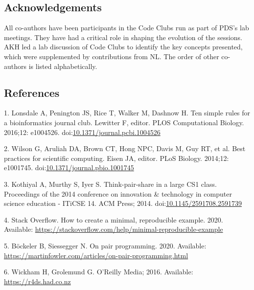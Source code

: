\documentclass[
  11pt,
]{article}
\begin{document}
\hypertarget{acknowledgements}{%
\subsection{Acknowledgements}\label{acknowledgements}}

All co-authors have been participants in the Code Clubs run as part of
PDS's lab meetings. They have had a critical role in shaping the
evolution of the sessions. AKH led a lab discussion of Code Clubs to
identify the key concepts presented, which were supplemented by
contributions from NL. The order of other co-authors is listed
alphabetically.

\newpage

\hypertarget{references}{%
\subsection{References}\label{references}}

\hypertarget{refs}{}
\leavevmode\hypertarget{ref-Lonsdale2016}{}%
1. Lonsdale A, Penington JS, Rice T, Walker M, Dashnow H. Ten simple
rules for a bioinformatics journal club. Lewitter F, editor. PLOS
Computational Biology. 2016;12: e1004526.
doi:\href{https://doi.org/10.1371/journal.pcbi.1004526}{10.1371/journal.pcbi.1004526}

\leavevmode\hypertarget{ref-Wilson2014}{}%
2. Wilson G, Aruliah DA, Brown CT, Hong NPC, Davis M, Guy RT, et al.
Best practices for scientific computing. Eisen JA, editor. PLoS Biology.
2014;12: e1001745.
doi:\href{https://doi.org/10.1371/journal.pbio.1001745}{10.1371/journal.pbio.1001745}

\leavevmode\hypertarget{ref-Kothiyal2014}{}%
3. Kothiyal A, Murthy S, Iyer S. Think-pair-share in a large CS1 class.
Proceedings of the 2014 conference on innovation \& technology in
computer science education - ITiCSE 14. ACM Press; 2014.
doi:\href{https://doi.org/10.1145/2591708.2591739}{10.1145/2591708.2591739}

\leavevmode\hypertarget{ref-StackOverflow_MREE}{}%
4. Stack Overflow. How to create a minimal, reproducible example. 2020.
Available:
\url{https://stackoverflow.com/help/minimal-reproducible-example}

\leavevmode\hypertarget{ref-Bockeler_2020}{}%
5. Böckeler B, Siessegger N. On pair programming. 2020. Available:
\url{https://martinfowler.com/articles/on-pair-programming.html}

\leavevmode\hypertarget{ref-Wickham_2016}{}%
6. Wickham H, Grolemund G. O'Reilly Media; 2016. Available:
\url{https://r4ds.had.co.nz}
\end{document}
